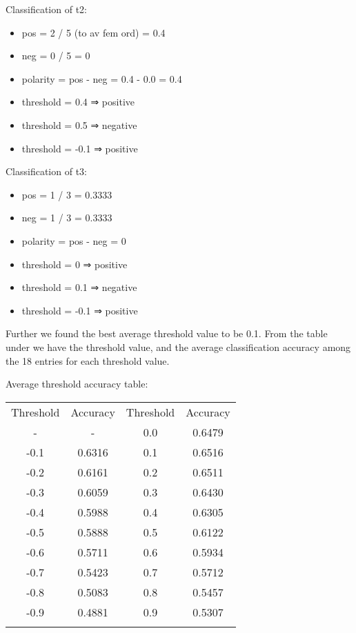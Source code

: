 Classification of t2:
\begin{itemize}
    \item pos = 2 / 5 (to av fem ord) = 0.4
    \item neg = 0 / 5 = 0
    \item polarity = pos - neg = 0.4 - 0.0 = 0.4
    \item threshold = 0.4 ⇒ positive
    \item threshold = 0.5 ⇒ negative
    \item threshold = -0.1 ⇒ positive
\end{itemize}

Classification of t3:
\begin{itemize}
    \item pos = 1 / 3 = 0.3333
    \item neg = 1 / 3 = 0.3333
    \item polarity = pos - neg = 0
    \item threshold = 0 ⇒ positive
    \item threshold = 0.1 ⇒ negative
    \item threshold = -0.1 ⇒ positive
\end{itemize}

Further we found the best average threshold value to be 0.1.
From the table under we have the threshold value, and the average
classification accuracy among the 18 entries for each threshold value. 

Average threshold accuracy table:
\hspace{0pt}\\
\begin{tabular}{ c c c c }
Threshold & Accuracy & Threshold & Accuracy \\
- & - & 0.0 & 0.6479 \\
-0.1 & 0.6316 & 0.1 & 0.6516 \\
-0.2 & 0.6161 & 0.2 & 0.6511 \\
-0.3 & 0.6059 & 0.3 & 0.6430 \\
-0.4 & 0.5988 & 0.4 & 0.6305 \\
-0.5 & 0.5888 & 0.5 & 0.6122 \\
-0.6 & 0.5711 & 0.6 & 0.5934 \\
-0.7 & 0.5423 & 0.7 & 0.5712 \\
-0.8 & 0.5083 & 0.8 & 0.5457 \\
-0.9 & 0.4881 & 0.9 & 0.5307 \\
\label{tbl:average_threshold_accuracy}
\end{tabular}

